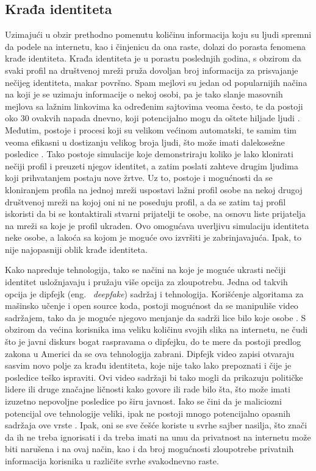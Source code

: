 \documentclass[a4paper]{article}
\begin{document}
\subsection{Krađa identiteta}
Uzimajući u obzir prethodno pomenutu količinu informacija koju su ljudi spremni da podele na internetu, kao i činjenicu da ona raste, dolazi do porasta fenomena krađe identiteta. Krađa identiteta je u porastu poslednjih godina, s obzirom da svaki profil na društvenoj mreži pruža dovoljan broj informacija za prisvajanje nečijeg identiteta, makar površno. Spam mejlovi su jedan od popularnijih načina na koji je se uzimaju informacije o nekoj osobi, pa je tako slanje masovnih mejlova sa lažnim linkovima ka određenim sajtovima veoma često, te da postoji oko 30 ovakvih napada dnevno, koji potencijalno mogu da oštete hiljade ljudi \cite{it1}. Međutim, postoje i procesi koji su velikom većinom automatski, te samim tim veoma efikasni u dostizanju velikog broja ljudi, što može imati dalekosežne posledice \cite{it2}. Tako postoje simulacije koje demonstriraju koliko je lako klonirati nečiji profil i preuzeti njegov identitet, a zatim poslati zahteve drugim ljudima koji prihvatanjem postaju nove žrtve. Uz to, postoje i mogućnosti da se kloniranjem profila na jednoj mreži uspostavi lažni profil osobe na nekoj drugoj društvenoj mreži na kojoj oni ni ne poseduju profil, a da se zatim taj profil iskoristi da bi se kontaktirali stvarni prijatelji te osobe, na osnovu liste prijatelja na mreži sa koje je profil ukraden. Ovo omogućava uverljivu simulaciju identiteta neke osobe, a lakoća sa kojom je moguće ovo izvršiti je zabrinjavajuća. Ipak, to nije najopasniji oblik krađe identiteta.
\par Kako napreduje tehnologija, tako se načini na koje je moguće ukrasti nečiji identitet usložnjavaju i pružaju više opcija za zloupotrebu. Jedna od takvih opcija je dipfejk (eng. ~{\em deepfake}) sadržaj i tehnologija. Korišćenje algoritama za mašinsko učenje i open source koda, postoji mogućnost da se manipuliše video sadržajem, tako da je moguće njegovo menjanje da sadrži lice bilo koje osobe \cite{it3}.  S obzirom da većina korisnika ima veliku količinu svojih slika na internetu, ne čudi što je javni diskurs bogat raspravama o dipfejku, do te mere da postoji predlog zakona u Americi da se ova tehnologija zabrani. Dipfejk video zapisi otvaraju sasvim novo polje za krađu identiteta, koje nije tako lako prepoznati i čije je posledice teško ispraviti. Ovi video sadržaji bi tako mogli da prikazuju političke lidere ili druge značajne ličnosti kako govore ili rade bilo šta, što može imati izuzetno nepovoljne posledice po širu javnost. Iako se čini da je maliciozni potencijal ove tehnologije veliki, ipak ne postoji mnogo potencijalno opasnih sadržaja ove vrste \cite{it4}. Ipak, oni se sve češće koriste u svrhe sajber nasilja, što znači da ih ne treba ignorisati i da treba imati na umu da privatnost na internetu može biti narušena i na ovaj način, kao i da broj mogućnosti zloupotrebe privatnih informacija korisnika u različite svrhe svakodnevno raste.  
\end{document}
